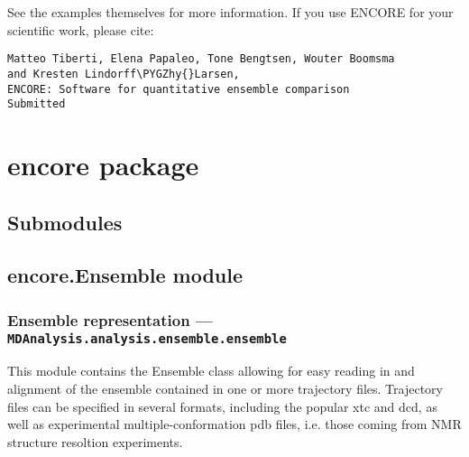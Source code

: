 \documentclass[letterpaper,10pt,english]{sphinxmanual}
\def\PYGZhy{\char`\-}
\begin{document}
See the examples themselves for more information.
If you use ENCORE for your scientific work, please cite:

\begin{Verbatim}[commandchars=\\\{\}]
Matteo Tiberti, Elena Papaleo, Tone Bengtsen, Wouter Boomsma
and Kresten Lindorff\PYGZhy{}Larsen,
ENCORE: Software for quantitative ensemble comparison
Submitted
\end{Verbatim}


\chapter{encore package}
\label{index:encore-package}

\section{Submodules}
\label{index:submodules}

\section{encore.Ensemble module}
\label{index:module-encore.Ensemble}\label{index:encore-ensemble-module}

\subsection{Ensemble representation --- \texttt{MDAnalysis.analysis.ensemble.ensemble}}
\label{index:ensemble-representation-mdanalysis-analysis-ensemble-ensemble}
This module contains the Ensemble class allowing for easy reading in 
and alignment of the ensemble contained in one or more trajectory files.
Trajectory files can be specified in several formats, including the popular
xtc and dcd, as well as experimental multiple-conformation pdb files, i.e.
those coming from NMR structure resoltion experiments.
\end{document}
